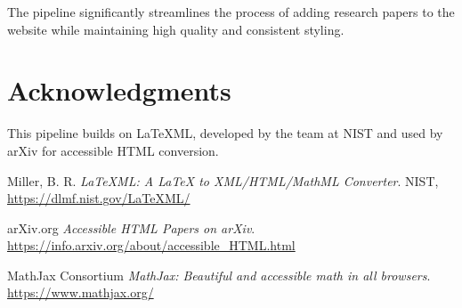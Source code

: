 \documentclass{article}
\begin{document}
The pipeline significantly streamlines the process of adding research papers to the website while maintaining high quality and consistent styling.

\section*{Acknowledgments}

This pipeline builds on LaTeXML, developed by the team at NIST and used by arXiv for accessible HTML conversion.

\begin{thebibliography}{9}

Miller, B. R.
\textit{LaTeXML: A LaTeX to XML/HTML/MathML Converter}.
NIST, \url{https://dlmf.nist.gov/LaTeXML/}

arXiv.org
\textit{Accessible HTML Papers on arXiv}.
\url{https://info.arxiv.org/about/accessible_HTML.html}

MathJax Consortium
\textit{MathJax: Beautiful and accessible math in all browsers}.
\url{https://www.mathjax.org/}

\end{thebibliography}
\end{document}
